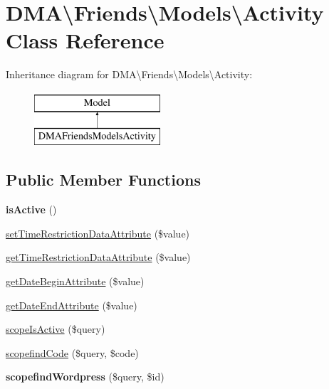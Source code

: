 \hypertarget{classDMA_1_1Friends_1_1Models_1_1Activity}{\section{D\-M\-A\textbackslash{}Friends\textbackslash{}Models\textbackslash{}Activity Class Reference}
\label{classDMA_1_1Friends_1_1Models_1_1Activity}
}
Inheritance diagram for D\-M\-A\textbackslash{}Friends\textbackslash{}Models\textbackslash{}Activity\-:\begin{figure}[H]
\begin{center}
\leavevmode
\includegraphics[height=2.000000cm]{dc/d8c/classDMA_1_1Friends_1_1Models_1_1Activity}
\end{center}
\end{figure}
\subsection*{Public Member Functions}
\begin{DoxyCompactItemize}
\item 
\hypertarget{classDMA_1_1Friends_1_1Models_1_1Activity_aa5a4543ce44bd5b87fee0651c2102daf}{{\bfseries is\-Active} ()}\label{classDMA_1_1Friends_1_1Models_1_1Activity_aa5a4543ce44bd5b87fee0651c2102daf}

\item 
\hyperlink{classDMA_1_1Friends_1_1Models_1_1Activity_ade0ffca24448c217def365d104e52866}{set\-Time\-Restriction\-Data\-Attribute} (\$value)
\item 
\hyperlink{classDMA_1_1Friends_1_1Models_1_1Activity_a98a904c739aca30f2a26152a481164b6}{get\-Time\-Restriction\-Data\-Attribute} (\$value)
\item 
\hyperlink{classDMA_1_1Friends_1_1Models_1_1Activity_aa704e99db7e4270f55a4cf30bd1a3429}{get\-Date\-Begin\-Attribute} (\$value)
\item 
\hyperlink{classDMA_1_1Friends_1_1Models_1_1Activity_a1309d8b4cd2107a6b196f448fb1e6229}{get\-Date\-End\-Attribute} (\$value)
\item 
\hyperlink{classDMA_1_1Friends_1_1Models_1_1Activity_acd3f12824d95be07b5221cdc9d64abf7}{scope\-Is\-Active} (\$query)
\item 
\hyperlink{classDMA_1_1Friends_1_1Models_1_1Activity_a9bb36aab36ff22a29b2a594617dd591c}{scopefind\-Code} (\$query, \$code)
\item 
\hypertarget{classDMA_1_1Friends_1_1Models_1_1Activity_a5a533a3f638f99d1dd0a8e0550def49e}{{\bfseries scopefind\-Wordpress} (\$query, \$id)}\label{classDMA_1_1Friends_1_1Models_1_1Activity_a5a533a3f638f99d1dd0a8e0550def49e}

\end{DoxyCompactItemize}

